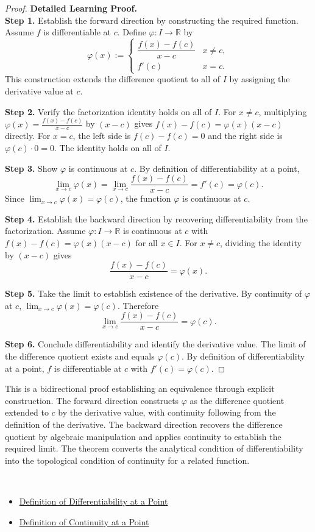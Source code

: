 \begin{proof}
\textbf{Detailed Learning Proof.}~\\

\textbf{Step 1.} Establish the forward direction by constructing the required function. Assume $f$ is differentiable at $c$. Define $\varphi : I \to \mathbb{R}$ by
\[
  \varphi(x) :=
  \begin{cases}
    \dfrac{f(x) - f(c)}{x - c} & x \neq c, \\[6pt]
    f'(c)                       & x = c.
  \end{cases}
\]
This construction extends the difference quotient to all of $I$ by assigning the derivative value at $c$.

\textbf{Step 2.} Verify the factorization identity holds on all of $I$. For $x \neq c$, multiplying $\varphi(x) = \frac{f(x)-f(c)}{x-c}$ by $(x-c)$ gives $f(x) - f(c) = \varphi(x)(x-c)$ directly. For $x = c$, the left side is $f(c) - f(c) = 0$ and the right side is $\varphi(c) \cdot 0 = 0$. The identity holds on all of $I$.

\textbf{Step 3.} Show $\varphi$ is continuous at $c$. By definition of differentiability at a point,
\[
  \lim_{x \to c} \varphi(x)
  = \lim_{x \to c} \frac{f(x) - f(c)}{x - c}
  = f'(c)
  = \varphi(c).
\]
Since $\lim_{x \to c} \varphi(x) = \varphi(c)$, the function $\varphi$ is continuous at $c$.

\textbf{Step 4.} Establish the backward direction by recovering differentiability from the factorization. Assume $\varphi : I \to \mathbb{R}$ is continuous at $c$ with $f(x) - f(c) = \varphi(x)(x-c)$ for all $x \in I$. For $x \neq c$, dividing the identity by $(x - c)$ gives
\[
  \frac{f(x) - f(c)}{x - c} = \varphi(x).
\]

\textbf{Step 5.} Take the limit to establish existence of the derivative. By continuity of $\varphi$ at $c$, $\lim_{x \to c} \varphi(x) = \varphi(c)$. Therefore
\[
  \lim_{x \to c} \frac{f(x) - f(c)}{x - c} = \varphi(c).
\]

\textbf{Step 6.} Conclude differentiability and identify the derivative value. The limit of the difference quotient exists and equals $\varphi(c)$. By definition of differentiability at a point, $f$ is differentiable at $c$ with $f'(c) = \varphi(c)$.
\end{proof}

\begin{remark*}
This is a bidirectional proof establishing an equivalence through explicit construction. The forward direction constructs $\varphi$ as the difference quotient extended to $c$ by the derivative value, with continuity following from the definition of the derivative. The backward direction recovers the difference quotient by algebraic manipulation and applies continuity to establish the required limit. The theorem converts the analytical condition of differentiability into the topological condition of continuity for a related function.
\end{remark*}

\begin{remark*}[Dependencies]~\\
\begin{itemize}
  \item \hyperref[def:differentiability-at-point]{Definition of Differentiability at a Point}
  \item \hyperref[def:continuity-at-point]{Definition of Continuity at a Point}
\end{itemize}
\end{remark*}